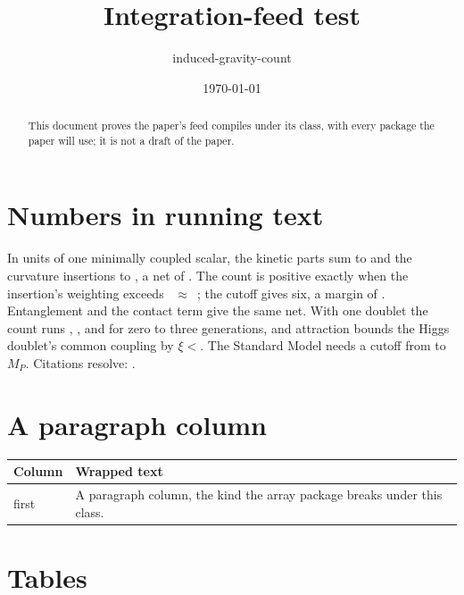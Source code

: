 \documentclass[aps,prd,twocolumn,nofootinbib]{revtex4-2}
\begin{document}
\title{Integration-feed test}
\author{induced-gravity-count}
\date{\today}
\begin{abstract}
This document proves the paper's feed compiles under its class, with every package the
paper will use; it is not a draft of the paper.
\end{abstract}
\maketitle

\section{Numbers in running text}

In units of one minimally coupled scalar, the kinetic parts sum to \smKinetic{} and the
curvature insertions to \smInsertion{}, a net of \smNet{}. The count is positive exactly
when the insertion's weighting exceeds \smThreshold{}~$\approx$~\smThresholdDecimal{};
the cutoff gives six, a margin of \smMarginPct{}. Entanglement \smEntanglement{} and the
contact term \smContact{} give the same net. With one doublet the count runs
\genCountZero, \genCountOne, \genCountTwo{} and \genCountThree{} for zero to three
generations, and attraction bounds the Higgs doublet's common coupling by
$\xi<{}$\smCouplingBound. The Standard Model needs a cutoff from \smCutoffLow{} to
\smCutoffHigh{}\,$M_P$. Citations resolve:
\cite{Sakharov1967,BrodaSzanecki2009,Tanaka1996,Kabat1995}.

\section{A paragraph column}

\begin{tabular}{p{}p{}}
\toprule
Column & Wrapped text \\
\midrule
first & A paragraph column, the kind the array package breaks under this class. \\
\bottomrule
\end{tabular}

\section{Tables}

\begin{table}
\caption{The conditions.}
\centering

\end{table}
\end{document}
